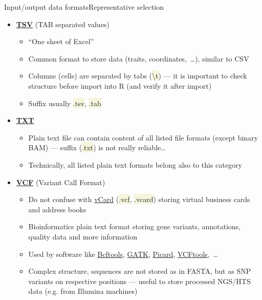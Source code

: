 \documentclass[compress, ucs, xelatex, 11pt, xcolor=svgnames, aspectratio=169,
	hyperref={
		bookmarks=true,
		unicode=true,
		colorlinks=true,
		pdftitle={Molecular data in R},
		plainpages=false,
		pdfauthor={Vojtech Zeisek},
		pdfsubject={Course about phylogeny and evolution in R},
		pdfcreator={XeLaTeX},
		pdfkeywords={R, evolution, phylogeny, molecular data},
		linkcolor=Crimson, %
		anchorcolor=Magenta, %
		citecolor=Magenta, %
		filecolor=Magenta, %
		menucolor=Magenta, %
		urlcolor=DodgerBlue, %
		pdftex},
	url={hyphens, lowtilde} %
	]{beamer}
\renewcommand{\texttt}[1]{\colorbox{Beige}{{\ttfamily #1}}}
\begin{document}
\begin{frame}[allowframebreaks]{Input/output data formats}{Representative selection}
\begin{itemize}
\begin{itemize}
			\item Used by applications like \href{https://github.com/pezmaster31/bamtools/wiki}{bamtools} or \href{https://www.htslib.org/}{SAMtools}
			\item Suffix usually \texttt{*.sam}
		\end{itemize}
		\item \href{https://en.wikipedia.org/wiki/Tab-separated_values}{\textbf{TSV}} (TAB separated values)
		\begin{itemize}
			\item \enquote{One sheet of Excel}
			\item Common format to store data (traits, coordinates,~\ldots), similar to CSV
			\item Columns (cells) are separated by tabs (\texttt{\textbackslash t}) --- it is important to check structure before import into R (and verify it after import)
			\item Suffix usually \texttt{*.tsv}, \texttt{*.tab}
		\end{itemize}
		\item \href{https://en.wikipedia.org/wiki/Text_file}{\textbf{TXT}}
		\begin{itemize}
			\item Plain text file can contain content of all listed file formats (except binary BAM) --- suffix (\texttt{*.txt}) is not really reliable\ldots
			\item Technically, all listed plain text formats belong also to this category
		\end{itemize}
		\item \href{https://en.wikipedia.org/wiki/Variant_Call_Format}{\textbf{VCF}} (Variant Call Format)
		\begin{itemize}
			\item Do not confuse with \href{https://en.wikipedia.org/wiki/VCard}{vCard} (\texttt{*.vcf}, \texttt{*.vcard}) storing virtual business cards and address books
			\item Bioinformatics plain text format storing gene variants, annotations, quality data and more information
			\item Used by software like \href{https://samtools.github.io/bcftools/}{Bcftools}, \href{https://gatk.broadinstitute.org/hc/en-us}{GATK}, \href{https://broadinstitute.github.io/picard/}{Picard}, \href{https://vcftools.github.io/}{VCFtools},~\ldots
			\item Complex structure, sequences are not stored as in FASTA, but as SNP variants on respective positions --- useful to store processed NGS/HTS data (e.g. from Illumina machines)

\end{itemize}
\end{itemize}
\end{frame}
\end{document}
